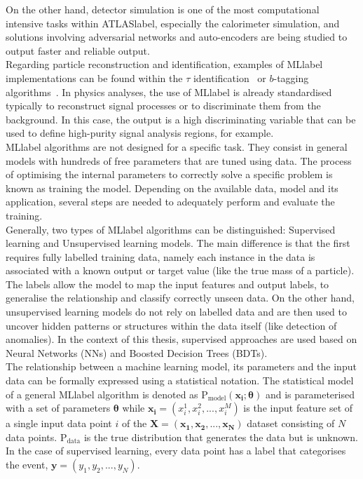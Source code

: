 On the other hand, detector simulation is one of the most computational intensive tasks within \acrshort{ATLASlabel}, especially the calorimeter simulation, and solutions involving adversarial networks and auto-encoders are being studied to output faster and reliable output.\\

Regarding particle reconstruction and identification, examples of \acrshort{MLlabel} implementations can be found within the $\tau$ identification~\cite{ATLAS:2019uhp} or $b$-tagging algorithms~\cite{ATL-PHYS-PUB-2020-014}. In physics analyses, the use of \acrshort{MLlabel} is already standardised typically to reconstruct signal processes or to discriminate them from the background. In this case, the output is a high discriminating variable that can be used to define high-purity signal analysis regions, for example.\\

\acrshort{MLlabel} algorithms are not designed for a specific task. They consist in general models with hundreds of free parameters that are tuned using data. The process of optimising the internal parameters to correctly solve a specific problem is known as training the model. Depending on the available data, model and its application, several steps are needed to adequately perform and evaluate the training.\\

Generally, two types of \acrshort{MLlabel} algorithms can be distinguished: Supervised learning and Unsupervised learning models. The main difference is that the first requires fully labelled training data, namely each instance in the data is associated with a known output or target value (like the true mass of a particle). The labels allow the model to map the input features and output labels, to generalise the relationship and classify correctly unseen data. On the other hand, unsupervised learning models do not rely on labelled data and are then used to uncover hidden patterns or structures within the data itself (like detection of anomalies). In the context of this thesis, supervised approaches are used based on Neural Networks (NNs) and Boosted Decision Trees (BDTs).\\

The relationship between a machine learning model, its parameters and the input data can be formally expressed using  a statistical notation. The statistical model of a general \acrshort{MLlabel} algorithm is denoted as $\text{P}_\text{model}(\mathbf{x_i}; \boldsymbol{\theta})$ and is parameterised with a set of parameters $\boldsymbol{\theta}$ while $\mathbf{x_i}=(x_i^1,x_i^2,...,x_i^M)$ is the input feature set of a single input data point $i$ of the $\mathbf{X}=(\mathbf{x_1},\mathbf{x_2},...,\mathbf{x_N})$ dataset consisting of $N$ data points. $\text{P}_\text{data}$ is the true distribution that generates the data but is unknown. In the case of supervised learning, every data point has a label that categorises the event, $\mathbf{y}=(y_1,y_2,...,y_N)$.

